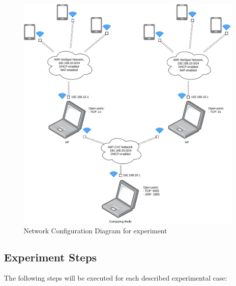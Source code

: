 \begin{figure}[H]
	\centering
	\includegraphics[width=\linewidth, keepaspectratio]{images/Deployment Diagram-Network_Diagram.pdf}
\caption{Network Configuration Diagram for experiment}
\label{fig:network-diagram}
\end{figure}

\subsection{Experiment Steps}\label{experiment-steps}

The following steps will be executed for each described experimental
case:


